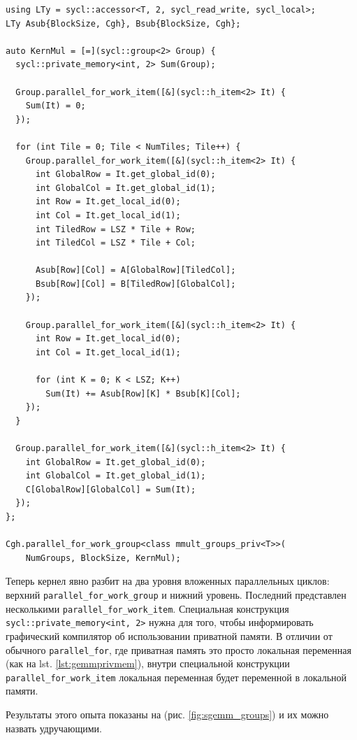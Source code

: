 \documentclass[a4paper,12pt,oneside]{article}
\begin{document}
\begin{lstlisting}[caption={Перемножение матриц, явный параллелизм},label={lst:gemmnested}]
using LTy = sycl::accessor<T, 2, sycl_read_write, sycl_local>;
LTy Asub{BlockSize, Cgh}, Bsub{BlockSize, Cgh};

auto KernMul = [=](sycl::group<2> Group) {
  sycl::private_memory<int, 2> Sum(Group);

  Group.parallel_for_work_item([&](sycl::h_item<2> It) { 
    Sum(It) = 0;
  });

  for (int Tile = 0; Tile < NumTiles; Tile++) {
    Group.parallel_for_work_item([&](sycl::h_item<2> It) {
      int GlobalRow = It.get_global_id(0);
      int GlobalCol = It.get_global_id(1);
      int Row = It.get_local_id(0);
      int Col = It.get_local_id(1);
      int TiledRow = LSZ * Tile + Row;
      int TiledCol = LSZ * Tile + Col;

      Asub[Row][Col] = A[GlobalRow][TiledCol];
      Bsub[Row][Col] = B[TiledRow][GlobalCol];
    });

    Group.parallel_for_work_item([&](sycl::h_item<2> It) {
      int Row = It.get_local_id(0);
      int Col = It.get_local_id(1);

      for (int K = 0; K < LSZ; K++)
        Sum(It) += Asub[Row][K] * Bsub[K][Col];
    });
  }

  Group.parallel_for_work_item([&](sycl::h_item<2> It) {
    int GlobalRow = It.get_global_id(0);
    int GlobalCol = It.get_global_id(1);
    C[GlobalRow][GlobalCol] = Sum(It);
  });
};

Cgh.parallel_for_work_group<class mmult_groups_priv<T>>(
    NumGroups, BlockSize, KernMul);
\end{lstlisting}

Теперь кернел явно разбит на два уровня вложенных параллельных циклов: верхний \lstinline!parallel_for_work_group! и нижний уровень. Последний представлен несколькими \lstinline!parallel_for_work_item!.
Специальная конструкция \lstinline!sycl::private_memory<int, 2>! нужна для того, чтобы информировать графический компилятор об использовании приватной памяти.
В отличии от обычного \lstinline!parallel_for!, где приватная память это просто локальная переменная (как на lst. \ref{lst:gemmprivmem}), внутри специальной конструкции \lstinline!parallel_for_work_item! локальная переменная будет переменной в локальной памяти.

Результаты этого опыта показаны на (рис. \ref{fig:sgemm_groups}) и их можно назвать удручающими.
\end{document}
